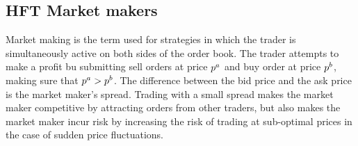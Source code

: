 \subsection{HFT Market makers}\label{section:market_maker}
Market making is the term used for strategies in which the trader is simultaneously active on both sides of the order book. The trader attempts to make a profit bu submitting sell orders at price $p^a$ and buy order at price $p^b$, making sure that $p^a > p^b$. The difference between the bid price and the ask price is the market maker's spread. Trading with a small spread makes the market maker competitive by attracting orders from other traders, but also makes the market maker incur risk by increasing the risk of trading at sub-optimal prices in the case of sudden price fluctuations. 

